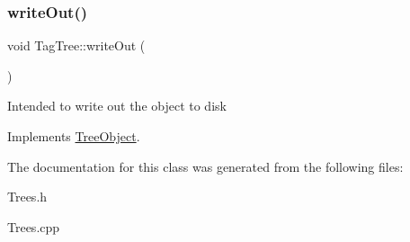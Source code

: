 \subsubsection{\texorpdfstring{write\+Out()}{writeOut()}}
{\footnotesize\ttfamily void Tag\+Tree\+::write\+Out (\begin{DoxyParamCaption}{ }\end{DoxyParamCaption})\hspace{0.3cm}{\ttfamily [virtual]}}

Intended to write out the object to disk 

Implements \mbox{\hyperlink{classTreeObject_abf2bf88337bec961784b5dfeb9b795ed}{Tree\+Object}}.



The documentation for this class was generated from the following files\+:\begin{DoxyCompactItemize}
\item 
Trees.\+h\item 
Trees.\+cpp\end{DoxyCompactItemize}

